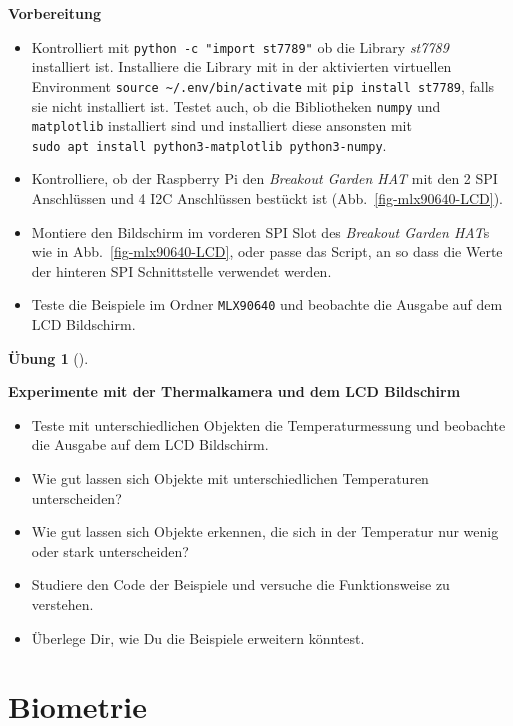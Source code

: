 \documentclass[
  11pt,
  a4paperpaper,
  oneside, openany  ,captions=tableheading
]{scrbook}
\providecommand{\tightlist}{%
  \setlength{\itemsep}{0pt}\setlength{\parskip}{0pt}}
\theoremstyle{definition}
\newtheorem{exercise}{Übung}[chapter]
\theoremstyle{remark}
\begin{document}
\textbf{Vorbereitung}

\begin{itemize}
\tightlist
\item
  Kontrolliert mit \texttt{python\ -c\ "import\ st7789"} ob die Library
  \emph{st7789} installiert ist. Installiere die Library mit in der
  aktivierten virtuellen Environment
  \texttt{source\ \textasciitilde{}/.env/bin/activate} mit
  \texttt{pip\ install\ st7789}, falls sie nicht installiert ist. Testet
  auch, ob die Bibliotheken \texttt{numpy} und \texttt{matplotlib}
  installiert sind und installiert diese ansonsten mit
  \texttt{sudo\ apt\ install\ python3-matplotlib\ python3-numpy}.
\item
  Kontrolliere, ob der Raspberry Pi den \emph{Breakout Garden HAT} mit
  den 2 SPI Anschlüssen und 4 I2C Anschlüssen bestückt ist
  (Abb.~\ref{fig-mlx90640-LCD}).
\item
  Montiere den Bildschirm im vorderen SPI Slot des \emph{Breakout Garden
  HAT}s wie in Abb.~\ref{fig-mlx90640-LCD}, oder passe das Script, an so
  dass die Werte der hinteren SPI Schnittstelle verwendet werden.
\item
  Teste die Beispiele im Ordner \texttt{MLX90640} und beobachte die
  Ausgabe auf dem LCD Bildschirm.
\end{itemize}

\begin{exercise}[]\protect\hypertarget{exr-thermalkamera-LCD}{}\label{exr-thermalkamera-LCD}

\textbf{Experimente mit der Thermalkamera und dem LCD Bildschirm}

\begin{itemize}
\tightlist
\item
  Teste mit unterschiedlichen Objekten die Temperaturmessung und
  beobachte die Ausgabe auf dem LCD Bildschirm.
\item
  Wie gut lassen sich Objekte mit unterschiedlichen Temperaturen
  unterscheiden?
\item
  Wie gut lassen sich Objekte erkennen, die sich in der Temperatur nur
  wenig oder stark unterscheiden?
\item
  Studiere den Code der Beispiele und versuche die Funktionsweise zu
  verstehen.
\item
  Überlege Dir, wie Du die Beispiele erweitern könntest.
\end{itemize}

\end{exercise}

\chapter{Biometrie}\label{biometrie}
\end{document}
